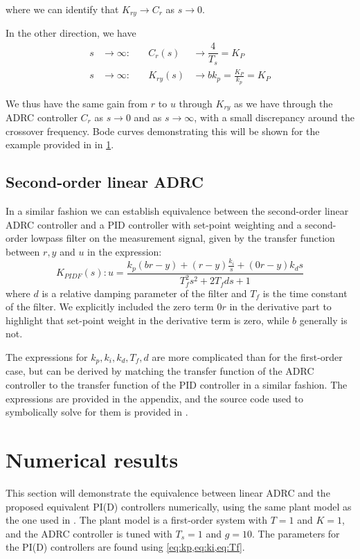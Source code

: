 \documentclass[letterpaper, 10 pt, conference]{ieeeconf}
\begin{document}
where we can identify that $K_{ry} \to C_r$ as $s \to 0$.

In the other direction, we have
\begin{align}
	s &\to \infty:  & \quad C_r(s) &\to \dfrac{4}{T_s} = K_P\\
	s &\to \infty:  & \quad K_{ry}(s) &\to b k_p = \frac{K_P}{k_p} = K_P
\end{align}

We thus have the same gain from $r$ to $u$ through $K_{ry}$ as we have through the ADRC controller $C_r$ as $s \to 0$ and as $s \to \infty$, with a small discrepancy around the crossover frequency. Bode curves demonstrating this will be shown for the example provided in \cite{herbst2013simulative} in \cref{sec:numerical}.

\subsection{Second-order linear ADRC}
In a similar fashion we can establish equivalence between the second-order linear ADRC controller and a PID controller with set-point weighting and a second-order lowpass filter on the measurement signal, given by the transfer function between $r,y$ and $u$ in the expression:
$$K_{PIDF}(s) : u = \dfrac{k_p (br - y) + (r-y)\frac{k_i}{s} + (0r - y)k_d s}{T_f^2s^2 + 2T_f d s + 1}$$
where $d$ is a relative damping parameter of the filter and $T_f$ is the time constant of the filter. We explicitly included the zero term $0r$ in the derivative part to highlight that set-point weight in the derivative term is zero, while $b$ generally is not.

The expressions for $k_p, k_i, k_d, T_f, d$ are more complicated than for the first-order case, but can be derived by matching the transfer function of the ADRC controller to the transfer function of the PID controller in a similar fashion. The expressions are provided in the appendix, and the source code used to symbolically solve for them is provided in \cite{repo}.

\section{Numerical results} \label{sec:numerical}
This section will demonstrate the equivalence between linear ADRC and the proposed equivalent PI(D) controllers numerically, using the same plant model as the one used in \cite{herbst2013simulative}. The plant model is a first-order system with $T = 1$ and $K = 1$, and the ADRC controller is tuned with $T_s = 1$ and $g = 10$. The parameters for the PI(D) controllers are found using \cref{eq:kp,eq:ki,eq:Tf}.
\end{document}

